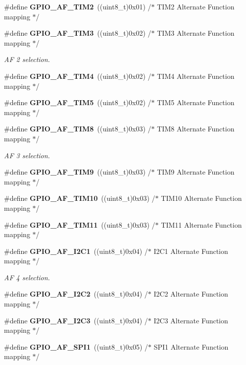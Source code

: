\begin{DoxyCompactItemize}
\#define \textbf{ G\+P\+I\+O\+\_\+\+A\+F\+\_\+\+T\+I\+M2}~((uint8\+\_\+t)0x01)  /$\ast$ T\+I\+M2 Alternate Function mapping $\ast$/
\item 
\#define \textbf{ G\+P\+I\+O\+\_\+\+A\+F\+\_\+\+T\+I\+M3}~((uint8\+\_\+t)0x02)  /$\ast$ T\+I\+M3 Alternate Function mapping $\ast$/
\begin{DoxyCompactList}\small\item\em AF 2 selection. \end{DoxyCompactList}\item 
\#define \textbf{ G\+P\+I\+O\+\_\+\+A\+F\+\_\+\+T\+I\+M4}~((uint8\+\_\+t)0x02)  /$\ast$ T\+I\+M4 Alternate Function mapping $\ast$/
\item 
\#define \textbf{ G\+P\+I\+O\+\_\+\+A\+F\+\_\+\+T\+I\+M5}~((uint8\+\_\+t)0x02)  /$\ast$ T\+I\+M5 Alternate Function mapping $\ast$/
\item 
\#define \textbf{ G\+P\+I\+O\+\_\+\+A\+F\+\_\+\+T\+I\+M8}~((uint8\+\_\+t)0x03)  /$\ast$ T\+I\+M8 Alternate Function mapping $\ast$/
\begin{DoxyCompactList}\small\item\em AF 3 selection. \end{DoxyCompactList}\item 
\#define \textbf{ G\+P\+I\+O\+\_\+\+A\+F\+\_\+\+T\+I\+M9}~((uint8\+\_\+t)0x03)  /$\ast$ T\+I\+M9 Alternate Function mapping $\ast$/
\item 
\#define \textbf{ G\+P\+I\+O\+\_\+\+A\+F\+\_\+\+T\+I\+M10}~((uint8\+\_\+t)0x03)  /$\ast$ T\+I\+M10 Alternate Function mapping $\ast$/
\item 
\#define \textbf{ G\+P\+I\+O\+\_\+\+A\+F\+\_\+\+T\+I\+M11}~((uint8\+\_\+t)0x03)  /$\ast$ T\+I\+M11 Alternate Function mapping $\ast$/
\item 
\#define \textbf{ G\+P\+I\+O\+\_\+\+A\+F\+\_\+\+I2\+C1}~((uint8\+\_\+t)0x04)  /$\ast$ I2\+C1 Alternate Function mapping $\ast$/
\begin{DoxyCompactList}\small\item\em AF 4 selection. \end{DoxyCompactList}\item 
\#define \textbf{ G\+P\+I\+O\+\_\+\+A\+F\+\_\+\+I2\+C2}~((uint8\+\_\+t)0x04)  /$\ast$ I2\+C2 Alternate Function mapping $\ast$/
\item 
\#define \textbf{ G\+P\+I\+O\+\_\+\+A\+F\+\_\+\+I2\+C3}~((uint8\+\_\+t)0x04)  /$\ast$ I2\+C3 Alternate Function mapping $\ast$/
\item 
\#define \textbf{ G\+P\+I\+O\+\_\+\+A\+F\+\_\+\+S\+P\+I1}~((uint8\+\_\+t)0x05)  /$\ast$ S\+P\+I1 Alternate Function mapping $\ast$/

\end{DoxyCompactItemize}
